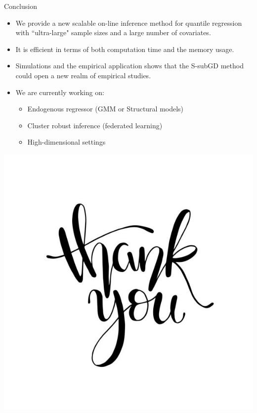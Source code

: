 \documentclass[beamer, t]{beamer}
\newcommand{\fm}[1]{\begin{frame}#1\end{frame}}
\begin{document}
\begin{frame}{Conclusion} 
	\begin{itemize}
		
		\item We provide a new scalable on-line inference method for quantile regression with ``ultra-large" sample sizes and a large number of covariates. 
		
		\item It is efficient in terms of both computation time and the memory usage. 

		\item Simulations and the empirical application shows that the S-subGD method could open a new realm of empirical studies. 
		
		\item We are currently working on:
		
		\begin{itemize}
			
			\item Endogenous regressor (GMM or Structural models)

			\item Cluster robust inference (federated learning)
			
			\item High-dimensional settings
			
			
		\end{itemize}
		
		
	\end{itemize} 
\end{frame}

\fm{
\vskip30pt
\centering
   \includegraphics[scale=1]{figures/thankyou.jpg}
}
\end{document}
